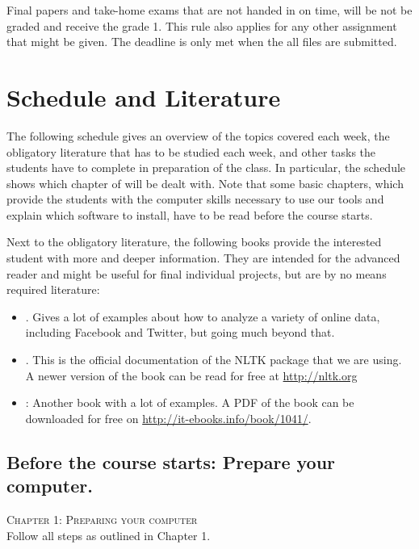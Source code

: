 \documentclass[a4paper,10pt]{report}
\begin{document}
Final papers and take-home exams that are not handed in on time, will be not be graded and receive the grade 1. This rule also applies for any other assignment that might be given. The deadline is only met when the all files are submitted.


 
 
 
\chapter{Schedule and Literature}

The following schedule gives an overview of the topics covered each week, the obligatory literature that has to be studied each week, and other tasks the students have to complete in preparation of the class.
In particular, the schedule shows which chapter of \cite{Trilling2016} will be dealt with. Note that some basic chapters, which provide the students with the computer skills necessary to use our tools and explain which software to install, have to be read before the course starts.

Next to the obligatory literature, the following books provide the interested student with more and deeper information. They are intended for the advanced reader and might be useful for final individual projects, but are by no means required literature:

\begin{itemize}
\item \citealp{Russel2013}. Gives a lot of examples about how to analyze a variety of online data, including Facebook and Twitter, but going much beyond that.
\item \citealp{Bird2009}. This is the official documentation of the NLTK package that we are using. A newer version of the book can be read for free at \url{http://nltk.org}
\item \citealp{McKinney2012}: Another book with a lot of examples. A PDF of the book can be downloaded for free on \url{http://it-ebooks.info/book/1041/}.
\end{itemize}



\section*{Before the course starts: Prepare your computer.}
\textsc{ Chapter 1: Preparing your computer}\\
Follow all steps as outlined in Chapter 1.
\end{document}
